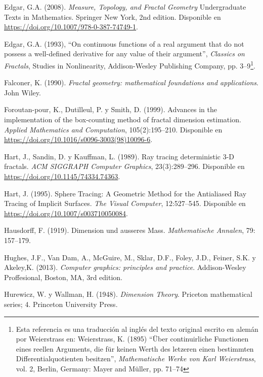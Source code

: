 \begin{thebibliography}{99}
     Edgar, G.A. (2008). \textit{Measure, Topology, and Fractal Geometry} Undergraduate Texts in Mathematics. Springer New York, 2nd edition. Disponible en \url{https://doi.org/10.1007/978-0-387-74749-1}.

     Edgar, G.A. (1993), ``On continuous functions of a real argument that do not possess a well-defined derivative for any value of their argument'', \textit{Classics on Fractals},  Studies in Nonlinearity, Addison-Wesley Publishing Company, pp. 3--9\footnote{Esta referencia es una traducción al inglés del texto original escrito en alemán por Weierstrass en: Weierstrass, K. (1895) ``Über continuirliche Functionen eines reellen Arguments, die für keinen Werth des letzeren einen bestimmten Differentialquotienten besitzen'', \textit{Mathematische Werke von Karl Weierstrass}, vol. 2, Berlin, Germany: Mayer and Müller, pp. 71–74}.

     Falconer, K. (1990). \textit{Fractal geometry: mathematical foundations and applications}. John Wiley.

     Foroutan-pour, K., Dutilleul, P. y Smith, D. (1999). Advances in the implementation of the box-counting method of fractal dimension estimation. \textit{Applied Mathematics and Computation}, 105(2):195--210. Disponible en \url{https://doi.org/10.1016/s0096-3003(98)10096-6}.

     Hart, J., Sandin, D. y Kauffman, L. (1989). Ray tracing deterministic 3-D fractals. \textit{ACM SIGGRAPH Computer Graphics}, 23(3):289--296. Disponible en \url{https://doi.org/10.1145/74334.74363}.

     Hart, J. (1995). Sphere Tracing: A Geometric Method for the Antialiased Ray Tracing of Implicit Surfaces. \textit{The Visual Computer}, 12:527--545. Disponible en \url{https://doi.org/10.1007/s003710050084}.

     Hausdorff, F. (1919). Dimension und ausseres Mass. \textit{Mathematische Annalen}, 79: 157--179.

     Hughes, J.F., Van Dam, A., McGuire, M., Sklar, D.F., Foley, J.D., Feiner, S.K. y Akeley,K. (2013). \textit{Computer graphics: principles and practice}. Addison-Wesley Proffesional, Boston, MA, 3rd edition.

    Hurewicz, W. y Wallman, H. (1948). \textit{Dimension Theory}. Priceton mathematical series; 4. Princeton University Press.


\end{thebibliography}
